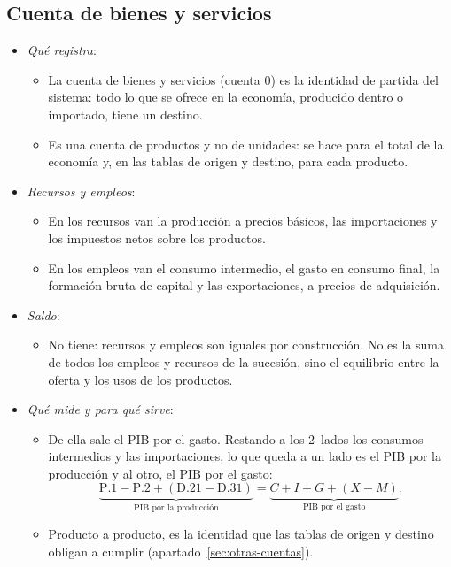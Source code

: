 \documentclass[11pt]{article}
\begin{document}
\begin{infografia}[p]
\centering
\caption{La sucesión de cuentas en forma de T}\label{figu:cuentas-t}
\end{infografia}

\subsection{Cuenta de bienes y servicios}\label{sec:cuenta-bys}

\begin{itemize}
\item \emph{Qué registra}:
  \begin{itemize}
  \item La cuenta de bienes y servicios (cuenta 0) es la identidad de partida del sistema: todo lo que se ofrece en la economía, producido dentro o importado, tiene un destino.
  \item Es una cuenta de productos y no de unidades: se hace para el total de la economía y, en las tablas de origen y destino, para cada producto.
  \end{itemize}
\item \emph{Recursos y empleos}:
  \begin{itemize}
  \item En los recursos van la producción a precios básicos, las importaciones y los impuestos netos sobre los productos.
  \item En los empleos van el consumo intermedio, el gasto en consumo final, la formación bruta de capital y las exportaciones, a precios de adquisición.
  \end{itemize}
\item \emph{Saldo}:
  \begin{itemize}
  \item No tiene: recursos y empleos son iguales por construcción. No es la suma de todos los empleos y recursos de la sucesión, sino el equilibrio entre la oferta y los usos de los productos.
  \end{itemize}
\item \emph{Qué mide y para qué sirve}:
  \begin{itemize}
  \item De ella sale el PIB por el gasto. Restando a los 2~lados los consumos intermedios y las importaciones, lo que queda a un lado es el PIB por la producción y al otro, el PIB por el gasto:
\[
\underbrace{\mathrm{P.1}-\mathrm{P.2}+(\mathrm{D.21}-\mathrm{D.31})}_{\text{PIB por la producción}}=\underbrace{C+I+G+(X-M)}_{\text{PIB por el gasto}} .
\]
  \item Producto a producto, es la identidad que las tablas de origen y destino obligan a cumplir (apartado~\ref{sec:otras-cuentas}).
  \end{itemize}
\end{itemize}
\end{document}

